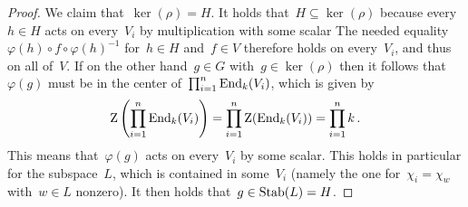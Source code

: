 \begin{proof}
  We claim that~$\ker(\rho) = H$.
  It holds that~$H \subseteq \ker(\rho)$ because every~$h \in H$ acts on every~$V_i$ by multiplication with some scalar
  The needed equality~$\varphi(h) \circ f \circ \varphi(h)^{-1}$ for~$h \in H$ and~$f \in V$ therefore holds on every~$V_i$, and thus on all of~$V$.
  If on the other hand~$g \in G$ with~$g \in \ker(\rho)$ then it follows that~$\varphi(g)$ must be in the center of~$\prod_{i=1}^n \operatorname{End}_k(V_i)$, which is given by
  \[
      \operatorname{Z}\left( \prod_{i=1}^n \operatorname{End}_k(V_i) \right)
    = \prod_{i=1}^n \operatorname{Z}(\operatorname{End}_k(V_i))
    = \prod_{i=1}^n k \,.
  \]
  This means that~$\varphi(g)$ acts on every~$V_i$ by some scalar.
  This holds in particular for the  subspace~$L$, which is contained in some~$V_i$ (namely the one for~$\chi_i = \chi_w$ with~$w \in L$ nonzero).
  It then holds that~$g \in \operatorname{Stab}(L) = H$.
\end{proof}




